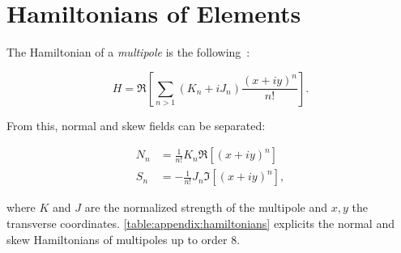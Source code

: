 \section{Hamiltonians of Elements}

The Hamiltonian of a \textit{multipole} is the
following~\cite{keintzel_jacqueline_beam_nodate,tomas_direct_2003,franchi_studies_2006}:

\begin{equation}
    H = \Re \left[ \sum_{n>1} (K_n + iJ_n) \frac{(x+iy)^n}{n!} \right].
    \label{eq:appendix:transfer_maps:hamiltonian}
\end{equation}

From this, normal and skew fields can be separated:

\begin{equation}
    \begin{aligned}
        N_n &= \frac{1}{n!} K_n \Re \left[ (x+iy)^n \right] \\
        S_n &= -\frac{1}{n!} J_n \Im \left[ (x+iy)^n \right],
    \end{aligned}
\end{equation}

where $K$ and $J$ are the normalized strength of the multipole and $x,y$ the transverse coordinates.
\cref{table:appendix:hamiltonians} explicits the normal and skew Hamiltonians of multipoles up to
order 8.

